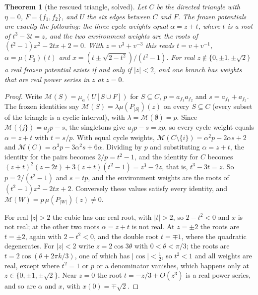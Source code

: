 \documentclass[11pt]{amsart}
\theoremstyle{plain}
\newtheorem{theorem}{Theorem}[section]
\theoremstyle{definition}
\theoremstyle{remark}
\numberwithin{equation}{section}
\newcommand{\Mpot}{\mathcal{M}}           %
\begin{document}
\begin{theorem}[the rescued triangle, solved]\label{thm:triangle-solved}
Let $C$ be the directed triangle with $\eta=0$, $F=\{f_1,f_2\}$, and $U$ the six edges between $C$ and $F$. The frozen potentials are exactly the following: the three cycle weights equal $\alpha=z+t$, where $t$ is a root of $t^{3}-3t=z$, and the two environment weights are the roots of $(t^{2}-1)x^{2}-2tx+2=0$. With $z=v^{3}+v^{-3}$ this reads $t=v+v^{-1}$, $\alpha=\mu(P_3)(t)$ and $x=(t\pm\sqrt{2-t^{2}})/(t^{2}-1)$. For real $z\notin\{0,\pm1,\pm\sqrt2\}$ a real frozen potential exists if and only if $|z|<2$, and one branch has weights that are real power series in $z$ at $z=0$.
\end{theorem}
\begin{proof}
Write $\Mpot(S)=\mu_a(U[S\cup F])$ for $S\subseteq C$, $p=a_{f_1}a_{f_2}$ and $s=a_{f_1}+a_{f_2}$. The frozen identities say $\Mpot(S)=\lambda\mu(P_{|S|})(z)$ on every $S\subseteq C$ (every subset of the triangle is a cyclic interval), with $\lambda=\Mpot(\emptyset)=p$. Since $\Mpot(\{j\})=a_jp-s$, the singletons give $a_jp-s=zp$, so every cycle weight equals $\alpha=z+t$ with $t=s/p$. With equal cycle weights, $\Mpot(C\setminus\{i\})=\alpha^{2}p-2\alpha s+2$ and $\Mpot(C)=\alpha^{3}p-3\alpha^{2}s+6\alpha$. Dividing by $p$ and substituting $\alpha=z+t$, the identity for the pairs becomes $2/p=t^{2}-1$, and the identity for $C$ becomes $(z+t)^{2}(z-2t)+3(z+t)(t^{2}-1)=z^{3}-2z$, that is, $t^{3}-3t=z$. So $p=2/(t^{2}-1)$ and $s=tp$, and the environment weights are the roots of $(t^{2}-1)x^{2}-2tx+2$. Conversely these values satisfy every identity, and $\Mpot(W)=p\,\mu(P_{|W|})(z)\neq0$.

For real $|z|>2$ the cubic has one real root, with $|t|>2$, so $2-t^{2}<0$ and $x$ is not real; at the other two roots $\alpha=z+t$ is not real. At $z=\pm2$ the roots are $t=\pm2$, again with $2-t^2<0$, and the double root $t=\mp1$, where the quadratic degenerates. For $|z|<2$ write $z=2\cos3\theta$ with $0<\theta<\pi/3$; the roots are $t=2\cos(\theta+2\pi k/3)$, one of which has $|\cos|<\frac12$, so $t^{2}<1$ and all weights are real, except where $t^2=1$ or $p$ or a denominator vanishes, which happens only at $z\in\{0,\pm1,\pm\sqrt2\}$. Near $z=0$ the root $t=-z/3+O(z^{3})$ is a real power series, and so are $\alpha$ and $x$, with $x(0)=\mp\sqrt2$.
\end{proof}
\end{document}
